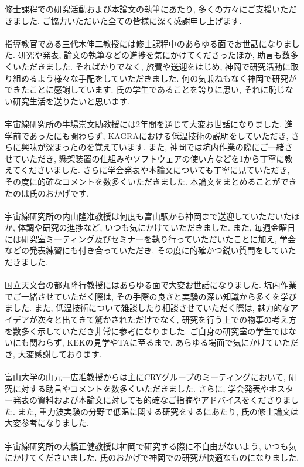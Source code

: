 修士課程での研究活動および本論文の執筆にあたり, 多くの方々にご支援いただきました. ご協力いただいた全ての皆様に深く感謝申し上げます. \\\\
\quad 指導教官である三代木伸二教授には修士課程中のあらゆる面でお世話になりました. 研究や発表, 論文の執筆などの進捗を気にかけてくださったほか, 助言も数多くいただきました. そればかりでなく, 旅費や送迎をはじめ, 神岡で研究活動に取り組めるよう様々な手配をしていただきました. 何の気兼ねもなく神岡で研究ができたことに感謝しています. 氏の学生であることを誇りに思い, それに恥じない研究生活を送りたいと思います. \\\\
\quad 宇宙線研究所の牛場崇文助教授には2年間を通じて大変お世話になりました. 進学前であったにも関わらず, KAGRAにおける低温技術の説明をしていただき, さらに興味が深まったのを覚えています. また, 神岡では坑内作業の際にご一緒させていただき, 懸架装置の仕組みやソフトウェアの使い方などを1から丁寧に教えてくださいました. さらに学会発表や本論文についても丁寧に見ていただき, その度に的確なコメントを数多くいただきました. 本論文をまとめることができたのは氏のおかげです.\\\\
\quad 宇宙線研究所の内山隆准教授は何度も富山駅から神岡まで送迎していただいたほか, 体調や研究の進捗など, いつも気にかけていただきました. また, 毎週金曜日には研究室ミーティング及びセミナーを執り行っていただいたことに加え, 学会などの発表練習にも付き合っていただき, その度に的確かつ鋭い質問をしていただきました.   \\\\
\quad 国立天文台の都丸隆行教授にはあらゆる面で大変お世話になりました. 坑内作業でご一緒させていただく際は, その手際の良さと実験の深い知識から多くを学びました. また, 低温技術について雑談したり相談させていただく際は, 魅力的なアイデアが次々と出てきて驚かされただけでなく, 研究を行う上での物事の考え方を数多く示していただき非常に参考になりました. ご自身の研究室の学生ではないにも関わらず, KEKの見学やTAに至るまで, あらゆる場面で気にかけていただき, 大変感謝しております. \\\\
\quad 富山大学の山元一広准教授からは主にCRYグループのミーティングにおいて, 研究に対する助言やコメントを数多くいただきました. さらに, 学会発表やポスター発表の資料および本論文に対しても的確なご指摘やアドバイスをくださりました. また, 重力波実験の分野で低温に関する研究をするにあたり, 氏の修士論文は大変参考になりました. \\\\
\quad 宇宙線研究所の大橋正健教授は神岡で研究する際に不自由がないよう, いつも気にかけてくださいました. 氏のおかげで神岡での研究が快適なものになりました.\\\\
